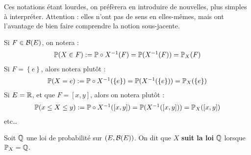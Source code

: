 \documentclass[../integ-proba.tex]{subfiles}
\begin{document}
    \begin{rem}
        Ces notations étant lourdes, on préfèrera en introduire de nouvelles, plus simples à interpréter.
        Attention : elles n'ont pas de sens en elles-mêmes, mais ont l'avantage de bien faire comprendre la notion sous-jacente.
        \begin{itemize}
            \itemb Si $F \in \mathcal{B}(E)$, on notera :
            \begin{displaymath}
                \begin{array}{rcl}
                    \mathbb{P}(X \in F) := \mathbb{P} \circ X^{-1}(F) = \mathbb{P}(X^{-1}(F)) = \mathbb{P}_X(F)
                \end{array}
            \end{displaymath}
            \itemb Si $F = \left\{ e \right\}$, alors notera plutôt :
            \begin{displaymath}
                \begin{array}{rcl}
                    \mathbb{P}(X = e) := \mathbb{P} \circ X^{-1}(\left\{ e \right\}) = \mathbb{P}(X^{-1}(\left\{ e \right\})) = \mathbb{P}_X(\left\{ e \right\})
                \end{array}
            \end{displaymath}
            \itemb Si $E=\mathbb{R}$, et que $F = [x,y]$, alors on notera plutôt :
            \begin{displaymath}
                \begin{array}{rcl}
                    \mathbb{P}(x \leq X \leq y) := \mathbb{P} \circ X^{-1}([x,y]) = \mathbb{P}(X^{-1}([x,y])) = \mathbb{P}_X([x,y])
                \end{array}
            \end{displaymath}
            \itemb etc\ldots
        \end{itemize}
    \end{rem}

    \begin{defi}
        Soit $\mathbb{Q}$ une loi de probabilité sur $\left(E, \mathcal{B}(E) \right)$.
        On dit que $X$ \textbf{suit la loi} $\mathbb{Q}$ lorsque $\mathbb{P}_X = \mathbb{Q}$.
    \end{defi}
\end{document}
